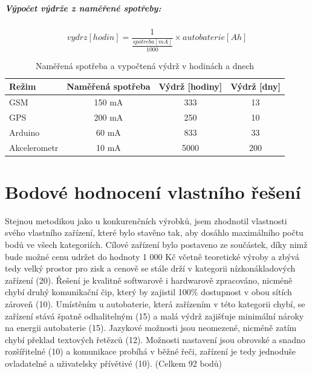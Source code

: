 \documentclass[FM,BP]{tulthesis}  %
\begin{document}
\paragraph{Výpočet výdrže z naměřené spotřeby:}
$$ vydrz [hodin] = \frac{1}{\frac{spotreba[mA]}{1000}} \times autobaterie[Ah] $$

\renewcommand{\arraystretch}{1.5}
\begin{table}[H]
\begin{center}
\begin{tabular}{| l | c | c |  c |}
\hline
Režim & Naměřená spotřeba & Výdrž [hodiny] & Výdrž [dny]\\
\hline
\hline
GSM & 150 mA & 333 & 13\\
\hline
GPS & 200 mA & 250 & 10\\
\hline
Arduino & 60 mA & 833 & 33\\
\hline
Akcelerometr & 10 mA & 5000 & 200\\
\hline
\end{tabular}
\end{center}
\caption{Naměřená spotřeba a vypočtená výdrž v hodinách a dnech}
\end{table}


\chapter{Bodové hodnocení vlastního řešení}
Stejnou metodikou jako u konkurenčních výrobků, jsem zhodnotil vlastnosti svého vlastního zařízení, které bylo stavěno tak, aby dosáhlo maximálního počtu bodů ve všech kategoriích. Cílové zařízení bylo postaveno ze součástek, díky nimž bude možné cenu udržet do hodnoty 1 000 Kč včetně teoretické výroby a zbývá tedy velký prostor pro zisk a cenově se stále drží v kategorii nízkonákladových zařízení (20). Řešení je kvalitně softwarově i hardwarově zpracováno, nicméně chybí druhý komunikační čip, který by zajistil 100\% dostupnost v obou sítích zároveň (10). Umístěním u autobaterie, která zařízením v této kategorii chybí, se zařízení stává špatně odhalitelným (15) a malá výdrž zajišťuje minimální nároky na energii autobaterie (15). Jazykové možnosti jsou neomezené, nicméně zatím chybí překlad textových řetězců (12). Možnosti nastavení jsou obrovské a snadno rozšířitelné (10) a komunikace probíhá v běžné řeči, zařízení je tedy jednoduše ovladatelné a uživatelsky přívětivé (10). (Celkem 92 bodů)
\end{document}
